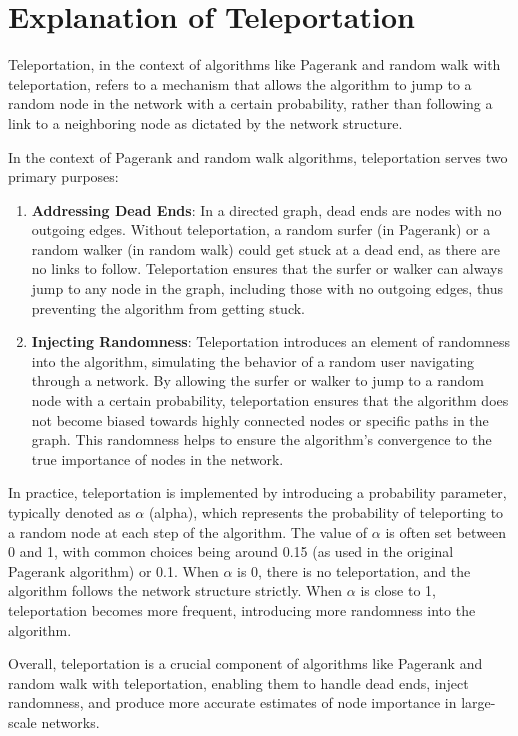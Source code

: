 \documentclass{article}
\begin{document}
\section{Explanation of Teleportation}

Teleportation, in the context of algorithms like Pagerank and random walk with teleportation, refers to a mechanism that allows the algorithm to jump to a random node in the network with a certain probability, rather than following a link to a neighboring node as dictated by the network structure.

In the context of Pagerank and random walk algorithms, teleportation serves two primary purposes:

\begin{enumerate}
    \item \textbf{Addressing Dead Ends}: In a directed graph, dead ends are nodes with no outgoing edges. Without teleportation, a random surfer (in Pagerank) or a random walker (in random walk) could get stuck at a dead end, as there are no links to follow. Teleportation ensures that the surfer or walker can always jump to any node in the graph, including those with no outgoing edges, thus preventing the algorithm from getting stuck.

    \item \textbf{Injecting Randomness}: Teleportation introduces an element of randomness into the algorithm, simulating the behavior of a random user navigating through a network. By allowing the surfer or walker to jump to a random node with a certain probability, teleportation ensures that the algorithm does not become biased towards highly connected nodes or specific paths in the graph. This randomness helps to ensure the algorithm's convergence to the true importance of nodes in the network.
\end{enumerate}

In practice, teleportation is implemented by introducing a probability parameter, typically denoted as $ \alpha $ (alpha), which represents the probability of teleporting to a random node at each step of the algorithm. The value of $ \alpha $ is often set between 0 and 1, with common choices being around 0.15 (as used in the original Pagerank algorithm) or 0.1. When $ \alpha $ is 0, there is no teleportation, and the algorithm follows the network structure strictly. When $ \alpha $ is close to 1, teleportation becomes more frequent, introducing more randomness into the algorithm.

Overall, teleportation is a crucial component of algorithms like Pagerank and random walk with teleportation, enabling them to handle dead ends, inject randomness, and produce more accurate estimates of node importance in large-scale networks.
\end{document}
